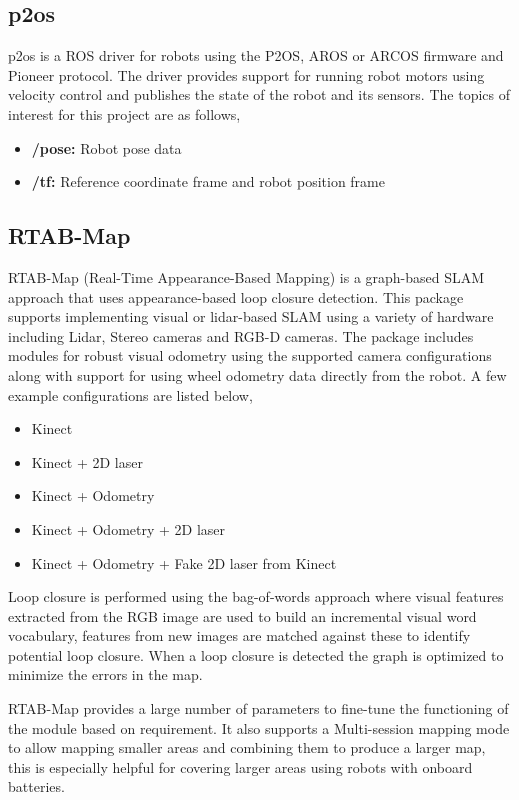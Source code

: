 \documentclass[conference, letterpaper]{IEEEtran}
\begin{document}
\subsection{p2os}

p2os is a ROS driver for robots using the P2OS, AROS or ARCOS firmware and 
Pioneer protocol. The driver provides support for running robot motors using 
velocity control and publishes the state of the robot and its sensors.
The topics of interest for this project are as follows,
\begin{itemize}
  \item \textbf{/pose:} Robot pose data
  \item \textbf{/tf:} Reference coordinate frame and robot position frame
\end{itemize}

\subsection{RTAB-Map}

RTAB-Map (Real-Time Appearance-Based Mapping) is a graph-based SLAM approach 
that uses appearance-based loop closure detection. This package supports 
implementing visual or lidar-based SLAM using a variety of hardware including
Lidar, Stereo cameras and RGB-D cameras. The package includes modules for 
robust visual odometry using the supported camera configurations along with 
support for using wheel odometry data directly from the robot. A few example
configurations are listed below,

\begin{itemize}
  \item Kinect
  \item Kinect + 2D laser
  \item Kinect + Odometry
  \item Kinect + Odometry + 2D laser
  \item Kinect + Odometry + Fake 2D laser from Kinect
\end{itemize}

Loop closure is performed using the bag-of-words approach where visual features
extracted from the RGB image are used to build an incremental visual word 
vocabulary, features from new images are matched against these to identify 
potential loop closure. When a loop closure is detected the graph is optimized 
to minimize the errors in the map. 

RTAB-Map provides a large number of parameters to fine-tune the functioning of 
the module based on requirement. It also supports a Multi-session mapping mode 
to allow mapping smaller areas and combining them to produce a larger map, this 
is especially helpful for covering larger areas using robots with onboard 
batteries. 
\end{document}
